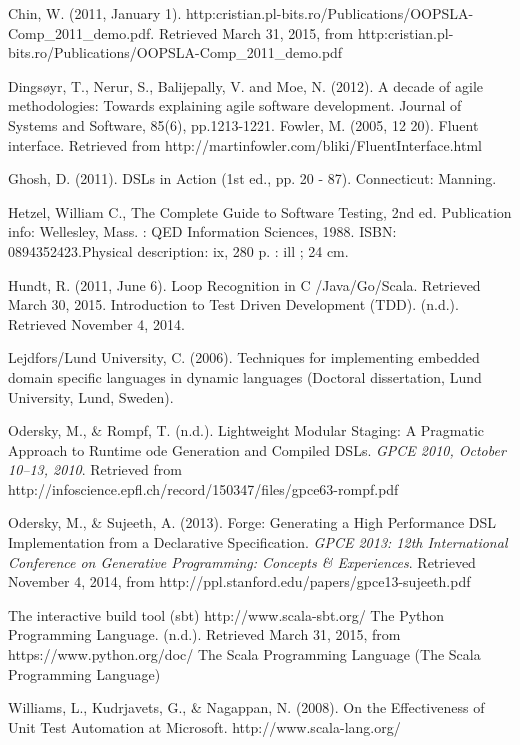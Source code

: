 \documentclass[12pt]{article}
\begin{document}
\begin{thebibliography}{9}

 Chin, W. (2011, January 1). http:\/\/cristian.pl-bits.ro/Publications/OOPSLA-Comp\_2011\_demo.pdf. Retrieved March 31, 2015, from http:\/\/cristian.pl-bits.ro/Publications/OOPSLA-Comp\_2011\_demo.pdf

 Dingsøyr, T., Nerur, S., Balijepally, V. and Moe, N. (2012). A decade of agile methodologies: Towards explaining agile software development. Journal of Systems and Software, 85(6), pp.1213-1221.
 Fowler, M. (2005, 12 20). Fluent interface. 
Retrieved from http://martinfowler.com/bliki/FluentInterface.html

Ghosh, D. (2011). DSLs in Action (1st ed., pp. 20 - 87). Connecticut: Manning.

 Hetzel, William C., The Complete Guide to Software Testing, 2nd ed. Publication info: Wellesley, Mass. : QED Information Sciences, 1988. ISBN: 0894352423.Physical description: ix, 280 p. : ill ; 24 cm.

Hundt, R. (2011, June 6). Loop Recognition in C /Java/Go/Scala. Retrieved March 30, 2015.
 Introduction to Test Driven Development (TDD). (n.d.). Retrieved November 4, 2014.

 Lejdfors/Lund University, C. (2006). Techniques for implementing embedded domain specific languages in dynamic languages (Doctoral dissertation, Lund University, Lund, Sweden).

 Odersky, M., \& Rompf, T. (n.d.). Lightweight Modular Staging: 
A Pragmatic Approach to Runtime ode Generation and Compiled DSLs. \textit{GPCE 2010, October 10–13, 2010}. Retrieved from http://infoscience.epfl.ch/record/150347/files/gpce63-rompf.pdf

 Odersky, M., \& Sujeeth, A. (2013). Forge: Generating a 
High Performance DSL Implementation from a Declarative Speciﬁcation. \textit{GPCE 2013: 12th International Conference on Generative Programming: Concepts \& Experiences}. 
Retrieved November 4, 2014, from http://ppl.stanford.edu/papers/gpce13-sujeeth.pdf

 The interactive build tool (sbt) http://www.scala-sbt.org/
The Python Programming Language. (n.d.). Retrieved March 31, 2015, from https://www.python.org/doc/
 The Scala Programming Language (The Scala Programming Language)

 Williams, L., Kudrjavets, G., \& Nagappan, N. (2008). On the Effectiveness of Unit Test Automation at Microsoft.
http://www.scala-lang.org/
\end{thebibliography}
\end{document}
